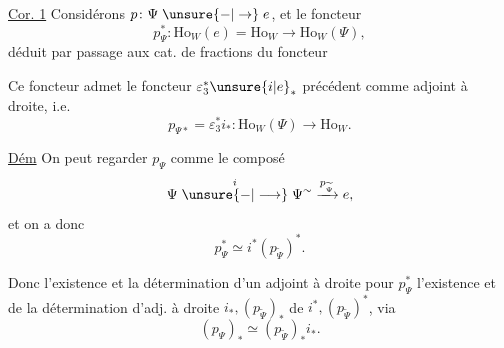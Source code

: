 
\uline{Cor. 1} Considérons $p\colon\Psi\mathrel{\unsure{-|\to}}e$, et le foncteur
\[
p_\Psi^*\colon\mathrm{Ho}_W(e)=\mathrm{Ho}_W\longrightarrow\mathrm{Ho}_W(\Psi),
\]
déduit par passage aux cat. de fractions du foncteur

Ce foncteur admet  le  foncteur $\varepsilon_3^*\unsure{i|e}_*$ précédent comme adjoint à droite, i.e.
\[
p_{\Psi*}=\varepsilon_3^*i_*\colon\mathrm{Ho}_W(\Psi)\longrightarrow\mathrm{Ho}_W.
\]

\uline{Dém} On peut regarder $p_\Psi$ comme le composé
\[
\Psi\mathrel{\overset{i}{\unsure{-|\longrightarrow}}}\Psi^{\sim}\xrightarrow{p_{\widetilde\Psi}}e,
\]
et on a donc
\[
p_\Psi^*\simeq i^*(p_{\widetilde\Psi})^*.
\]

Donc l'existence et la détermination d'un adjoint à droite pour $p_\Psi^*$  l'existence et de la détermination d'adj. à droite $i_*,(p_{\widetilde\Psi})_*$ de $i^*,(p_{\widetilde\Psi})^*$, via
\[
(p_\Psi)_*\simeq(p_{\widetilde\Psi})_*i_*.
\]
